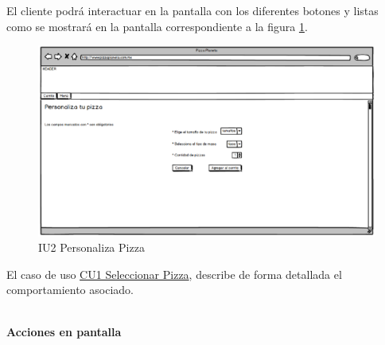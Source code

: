 	El cliente podrá interactuar en la pantalla con los diferentes botones y listas como se mostrará en la pantalla correspondiente a la figura \ref{IU2}.
	\begin{figure}[h]
		
		\begin{center}				
			
			\includegraphics[scale=0.50]{./imagenes/IUs/RegistroSolicitantes/iu1-IniciarSesion/IU2-PersonalizaPizza.png}
			\caption{IU2 Personaliza Pizza}
			\label{IU2}
			
		\end{center}
		
	\end{figure}
	
	
	El caso de uso \hyperlink{CU1}{CU1 Seleccionar Pizza}, describe de forma detallada el comportamiento asociado.
	
	\noindent \textbf{\\Acciones en pantalla}
	
